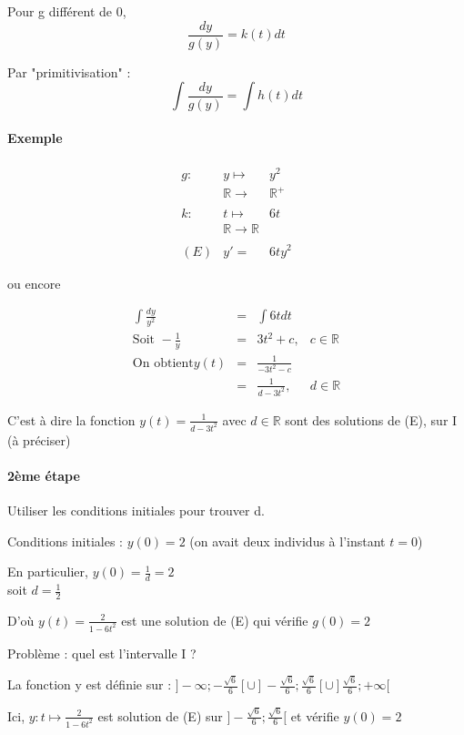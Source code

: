 Pour g différent de 0, \[\frac{dy}{g(y)} = k(t)dt\]

Par "primitivisation" : \[\int \frac{dy}{g(y)} = \int h(t)dt\]

\paragraph{Exemple} \[\begin{array}{rcl}
		g : & y \mapsto	& y^2 \\
			& \mathbb{R} \to & \mathbb{R}^+ \\
\\
		k : &t \mapsto & 6t \\
			&\mathbb{R} \to \mathbb{R} \\
\\
		(E)	&y' = &6t y^2 
\end{array}\]

ou encore

\[\begin{array}{rclr}
	\int \frac{dy}{y^2}& = &\int 6t dt \\
	\text{Soit } -\frac{1}{y} &=& 3t^2 + c, & c \in \mathbb{R} \\
	\text{On obtient} y(t) &=& \frac{1}{-3t^2 - c} \\
							&=& \frac{1}{d - 3t^2}, & d \in \mathbb{R}
\end{array}\]

C'est à dire la fonction $y(t) = \frac{1}{d-3t^2}$ avec $d \in \mathbb{R}$ sont des solutions de (E), sur I (à préciser)

\paragraph{2ème étape} Utiliser les conditions initiales pour trouver d.

Conditions initiales : $y(0) = 2$ (on avait deux individus à l'instant $t=0$)	


En particulier, $y(0) = \frac{1}{d} = 2$ ~\\
soit $d = \frac{1}{2}$

D'où $y(t) = \frac{2}{1-6t^2}$ est une solution de (E) qui vérifie $g(0) = 2$

Problème : quel est l'intervalle I ?

La fonction y est définie sur : $]-\infty; -\frac{\sqrt{6}}{6}[ \cup ]-\frac{\sqrt{6}}{6}; \frac{\sqrt{6}}{6}[ \cup ]\frac{\sqrt{6}}{6}; +\infty[$

Ici, $y : t \mapsto \frac{2}{1-6t^2}$ est solution de (E) sur $]-\frac{\sqrt{6}}{6}; \frac{\sqrt{6}}{6}[$ et vérifie $y(0) = 2$

